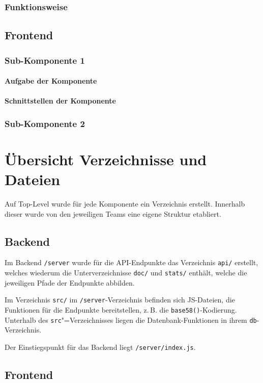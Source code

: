 \documentclass[a4paper,11pt,DIV=12,overfullrule=on]{scrreprt}%
\begin{document}
\subsubsection{Funktionsweise}
\subsection{Frontend}
\subsubsection{Sub-Komponente 1}
\paragraph{Aufgabe der Komponente}
\paragraph{Schnittstellen der Komponente}
\subsubsection{Sub-Komponente 2}
\section{Übersicht Verzeichnisse und Dateien}
Auf Top-Level wurde für jede Komponente ein Verzeichnis erstellt. Innerhalb dieser wurde von den jeweiligen Teams eine eigene Struktur etabliert.

\subsection{Backend}
Im Backend \texttt{/server} wurde für die \ac{API}-Endpunkte das Verzeichnis \texttt{api/} erstellt, welches wiederum die Unterverzeichnisse \texttt{doc/} und \texttt{stats/} enthält, welche die jeweiligen Pfade der Endpunkte abbilden.

Im Verzeichnis \texttt{src/} im \texttt{/server}-Verzeichnis befinden sich \ac{JS}-Dateien, die Funktionen für die Endpunkte bereitstellen, z.\,B. die \texttt{base58()}-Kodierung. Unterhalb des \texttt{src}"=Verzeichnisses liegen die Datenbank-Funktionen in ihrem \texttt{db}-Verzeichnis.

Der Einstiegspunkt für das Backend liegt \texttt{/server/index.js}.

\subsection{Frontend}
\end{document}

